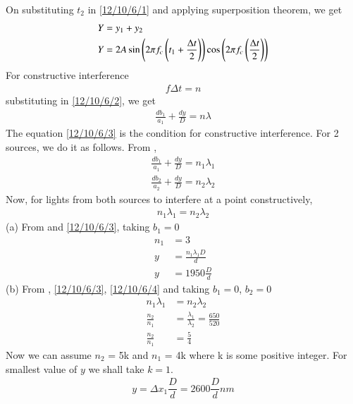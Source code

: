 \documentclass[journal,12pt,twocolumn]{IEEEtran}
\theoremstyle{remark}
\begin{document}
On substituting $t_2$ in \eqref{12/10/6/1} and applying superposition theorem, we get
\begin{align}
    Y &= y_1 + y_2\\
    Y &= 2A\sin\left(2\pi f_c\left(t_1 + \frac{\Delta t}{2}\right)\right)\cos\left(2\pi f_c\left(\frac{\Delta t}{2}\right)\right)
\end{align}
For constructive interference
\begin{align}
     f \Delta t = n
\end{align}
substituting in \eqref{12/10/6/2}, we get
\begin{align}
    \frac{db_1}{a_1} + \frac{dy}{D} = n\lambda \label{12/10/6/3}
\end{align}
The equation \eqref{12/10/6/3} is the condition for constructive interference.
For 2 sources, we do it as follows.
From , 
\begin{align}
    \frac{db_1}{a_1} + \frac{dy}{D} = n_1\lambda_1\\
    \frac{db_2}{a_2} + \frac{dy}{D} = n_2\lambda_2
\end{align}
Now, for lights from both sources to interfere at a point constructively, 
\begin{align}
    n_1\lambda_1 = n_2\lambda_2 \label{12/10/6/4}
\end{align}
(a) From  and \eqref{12/10/6/3}, taking $b_1 = 0$
\begin{align}
    n_1 &= 3\\
    y &= \frac{n_1\lambda_1 D}{d}\\
    y &= 1950\frac{D}{d}
\end{align}
(b) From , \eqref{12/10/6/3}, \eqref{12/10/6/4} and taking $b_1 = 0$, $b_2 = 0$
\begin{align}
  n_1 \lambda_1 &= n_2\lambda_2 \\
\frac{n_2}{n_1} &= \frac{\lambda_1}{\lambda_2} = \frac{650}{520}\\
\frac{n_2}{n_1} &= \frac{5}{4}
\end{align}
Now we can assume $n_2$ = 5k and $n_1$ = 4k where k is some positive integer.
For smallest value of $y$ we shall take $k=1$.
\begin{align}
    y =\Delta x_1 \dfrac{D}{d} = 2600\dfrac{D}{d}nm 
\end{align}


\end{document}
